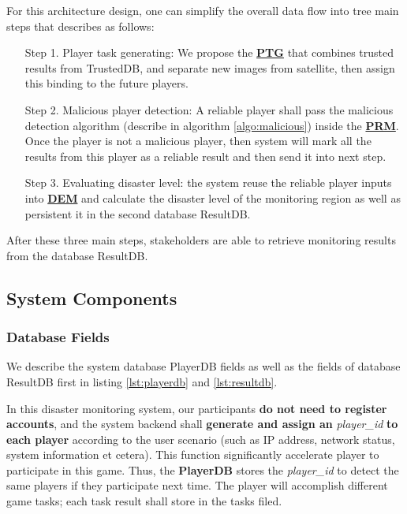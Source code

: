 For this architecture design, one can simplify the overall data flow into tree main steps 
that describes as follows:

\begin{itemize}

\item [Step 1.]  Player task generating: 
We propose the \textbf{\hyperref[idx:ptg]{PTG}}
that combines trusted results from TrustedDB, 
and separate new images from satellite, then assign this binding to the future players.

\item [Step 2.] Malicious player detection: 
A reliable player shall pass the malicious detection algorithm (describe in algorithm \ref{algo:malicious})
inside the \textbf{\hyperref[idx:prm]{PRM}}. 
Once the player is not a malicious player, then system will mark all the results from this player
as a reliable result and then send it into next step.

\item [Step 3.] Evaluating disaster level:  the system reuse the reliable player inputs 
into \textbf{\hyperref[idx:dem]{DEM}} and calculate the disaster level of the monitoring region
 as well as persistent it in the second database ResultDB.

\end{itemize}

After these three main steps, stakeholders are able to retrieve monitoring results from
the database ResultDB. 

\subsection{System Components}

\subsubsection{Database Fields}

We describe the system database PlayerDB 
fields as well as the fields of database ResultDB first in listing \ref{lst:playerdb}
and \ref{lst:resultdb}.

In this disaster monitoring system, our participants \textbf{do not need to register accounts},
and the system backend shall \textbf{generate and assign an} \emph{player\_id} \textbf{to each player} according to 
the user scenario (such as IP address, network status, system information et cetera).
This function significantly accelerate player to participate in this game. 
Thus, the \textbf{PlayerDB} stores the \emph{player\_id} to detect the same players if they participate next time. 
The player will accomplish different game tasks; each task result shall store in the tasks filed.


